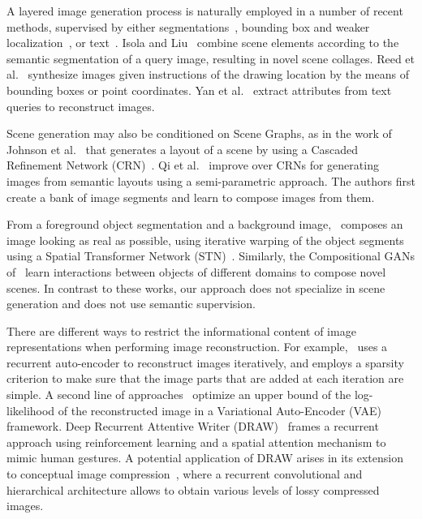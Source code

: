 \documentclass[10pt,twocolumn,letterpaper]{article}
\def\mypar#1{\vspace{1mm}{\bf #1.}\hspace{1mm}}
\begin{document}
\mypar{Supervised deep scene generation} 
A layered image generation process is naturally employed in a number of recent methods, supervised by either segmentations~\cite{SceneCollaging}, bounding box and weaker localization~\cite{Reed2016LearningWhat}, or text~\cite{Yan2016Attribute2Image}. Isola and Liu~\cite{SceneCollaging} combine scene elements according to the semantic segmentation of a query image, resulting in  novel scene collages. Reed et al.~\cite{Reed2016LearningWhat}  synthesize images given instructions of the drawing location by the means of bounding boxes or point coordinates. Yan et al.~\cite{Yan2016Attribute2Image} extract attributes from text queries to reconstruct images.

Scene generation may also be conditioned on Scene Graphs, as in the work of Johnson et al.~\cite{Johnson2018Scene} that generates a layout of a scene by using a Cascaded Refinement Network (CRN)~\cite{Chen17Photographic}.
Qi et al.~\cite{Qi2018SemiParametric} improve over CRNs for generating images from semantic layouts using a semi-parametric approach. The authors first create a bank of image segments and learn to compose images from them. 

 From a foreground object segmentation and a background image,~\cite{Lin2018STGAN} composes an image looking as real as possible, using iterative warping of the object segments using a Spatial Transformer Network (STN)~\cite{Jaderberg2015STN}. Similarly, the Compositional GANs of~\cite{Azadi2018compositional} learn interactions between objects of different domains to compose novel scenes.
In contrast to these works, our approach does not specialize in scene generation and does not use semantic supervision.


\mypar{Unsupervised deep sequential generative models}
There are different ways to restrict the informational content of image representations when performing image reconstruction. For example,~\cite{Rolfe2013discriminative} uses a recurrent auto-encoder to reconstruct images iteratively, and employs a sparsity criterion to make sure that the image parts that are added at each iteration are simple. 
A second line of approaches~\cite{Gregor2015DRAW,Eslami2016AIR,gregor2016compression} optimize an upper bound of the log-likelihood {of the reconstructed image} in a Variational Auto-Encoder (VAE)~\cite{kingma14iclr} framework.
Deep Recurrent Attentive Writer (DRAW)~\cite{Gregor2015DRAW} frames a recurrent approach using reinforcement learning and a spatial attention mechanism to mimic human gestures. A potential application of DRAW arises in its extension to conceptual image compression~\cite{gregor2016compression}, where a recurrent convolutional and hierarchical architecture allows to obtain various levels of lossy compressed images.
\end{document}
